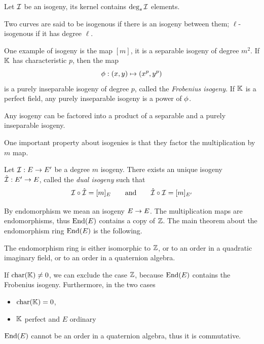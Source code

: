 \begin{theorem}
  Let $\mathcal{I}$ be an isogeny, its kernel contains $\deg_s\mathcal{I}$ elements.
\end{theorem}

Two curves are said to be isogenous if there is an isogeny between
them; $\ell$-isogenous if it has degree $\ell$.

One example of isogeny is the map $[m]$, it is a separable isogeny of
degree $m^2$. If $\mathbb{K}$ has characteristic $p$, then the map
\begin{equation}
  \label{eq:139}
  \phi : (x,y) \mapsto (x^p,y^p)
\end{equation}
is a purely inseparable isogeny of degree $p$, called the
\emph{Frobenius
  isogeny}. If $\mathbb{K}$ is a perfect field, any purely
inseparable isogeny is a power of $\phi$.

\begin{theorem}
  Any isogeny can be factored into a product of a separable and a
  purely inseparable isogeny.
\end{theorem}

One important property about isogenies is that they factor the
multiplication by $m$ map.

\begin{definition}
  Let $\mathcal{I} : E \rightarrow E'$ be a degree $m$ isogeny. There exists an
  unique isogeny $\hat{\mathcal{I}} : E' \rightarrow E$, called the
  \emph{dual isogeny} such
  that
  \[\mathcal{I}\circ\hat{\mathcal{I}} = [m]_E \qquad\text{and}\qquad \hat{\mathcal{I}}\circ\mathcal{I} =
  [m]_{E'}\]
\end{definition}

By endomorphism we mean an isogeny $E\rightarrow E$. The multiplication maps
are endomorphisms, thus $\operatorname{End}(E)$ contains a copy of $\mathbb{Z}$.  The main
theorem about the endomorphism ring $\operatorname{End}(E)$ is the following.

\begin{theorem}
  The endomorphism ring is either isomorphic to $\mathbb{Z}$, or to an order
  in a quadratic imaginary field, or to an order in a quaternion
  algebra.
\end{theorem}

If $\operatorname{char}(\mathbb{K})\ne0$, we can exclude the case $\mathbb{Z}$, because $\operatorname{End}(E)$
contains the Frobenius isogeny. Furthermore, in the two cases
\begin{itemize}
\item $\operatorname{char}(\mathbb{K})=0$,
\item $\mathbb{K}$ perfect and $E$ ordinary
\end{itemize}
$\operatorname{End}(E)$ cannot be an order in a quaternion algebra, thus it is
commutative.


